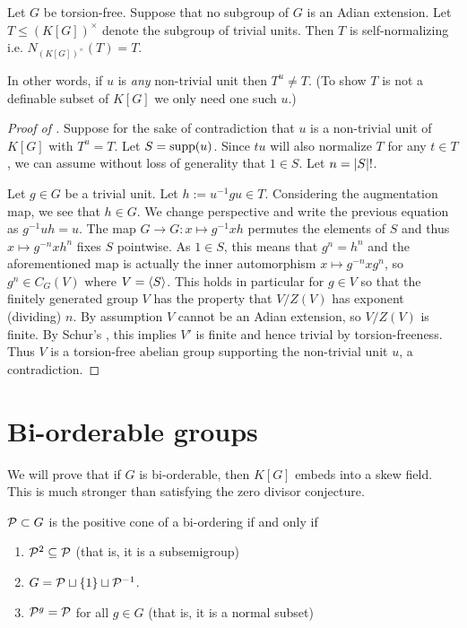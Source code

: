 \begin{proposition}
    \label{proposition:selfnormalizing_trivial_units}
    Let $G$ be torsion-free.
    Suppose that no subgroup of $G$ is an Adian extension.
    Let $T \leq (K[G])^\times$ denote the subgroup of trivial units.
    Then $T$ is self-normalizing i.e. $N_{(K[G])^\times}(T) = T$.
\end{proposition}

In other words, if $u$ is \emph{any} non-trivial unit then $T^u \neq T$.
(To show $T$ is not a definable subset of $K[G]$ we only need one such $u$.)

\begin{proof}[Proof of ]
    Suppose for the sake of contradiction that $u$ is a non-trivial unit of $K[G]$ with $T^u = T$.
    Let $S = \operatorname{supp}(u)$.
    Since $t u$ will also normalize $T$ for any $t \in T$, we can assume without loss of generality that $1 \in S$.
    Let $n = \lvert S \rvert!$.

    Let $g \in G$ be a trivial unit.
    Let $h := u^{-1} g u \in T$.
    Considering the augmentation map, we see that $h \in G$.
    We change perspective and write the previous equation as $g^{-1} u h = u$.
    The map $G \to G \colon x \mapsto g^{-1} x h$ permutes the elements of $S$ and thus $x \mapsto g^{-n} x h^n$ fixes $S$ pointwise.
    As $1 \in S$, this means that $g^n = h^n$ and the aforementioned map is actually the inner automorphism $x \mapsto g^{-n} x g^n$, so $g^n \in C_G(V)$ where $V = \langle S \rangle$.
    This holds in particular for $g \in V$ so that the finitely generated group $V$ has the property that $V / Z(V)$ has exponent (dividing) $n$.
    By assumption $V$ cannot be an Adian extension, so $V / Z(V)$ is finite.
    By Schur's , this implies $V'$ is finite and hence trivial by torsion-freeness.
    Thus $V$ is a torsion-free abelian group supporting the non-trivial unit $u$, a contradiction.
\end{proof}

\section{Bi-orderable groups}

We will prove that if $G$ is bi-orderable, then $K[G]$ embeds into a skew field.
This is much stronger than satisfying the zero divisor conjecture.

\begin{lemma}
    $\mathcal{P} \subset G$ is the positive cone of a bi-ordering if and only if
    \begin{enumerate}
        \item $\mathcal{P}^2 \subseteq \mathcal{P}$ (that is, it is a subsemigroup)
        \item $G = \mathcal{P} \sqcup \{1\} \sqcup \mathcal{P}^{-1}$.
        \item $\mathcal{P}^g = \mathcal{P}$ for all $g \in G$ (that is, it is a normal subset)
    \end{enumerate}
\end{lemma}

